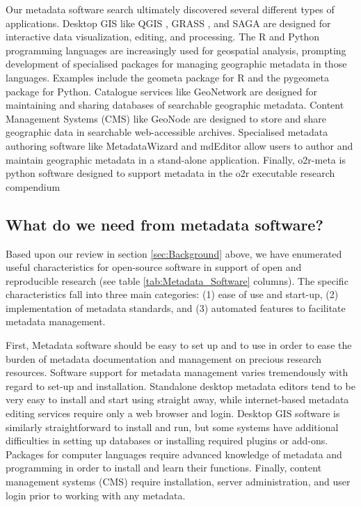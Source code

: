 \documentclass{isprs} %
\begin{document}
Our metadata software search ultimately discovered several different types of applications.
Desktop GIS like QGIS \citep{QGIS2022}, GRASS \citep{grass2020}, and SAGA \citep{gmd-8-1991-2015} are designed for interactive data visualization, editing, and processing.
The R and Python programming languages are increasingly used for geospatial analysis, prompting development of specialised packages for managing geographic metadata in those languages. 
Examples include the geometa package \citep{blondel_2022} for R and the pygeometa package \citep{pygeometa} for Python.
Catalogue services like GeoNetwork \cite{geonetwork} are designed for maintaining and sharing databases of searchable geographic metadata.
Content Management Systems (CMS) like GeoNode \cite{geonode} are designed to store and share geographic data in searchable web-accessible archives.
Specialised metadata authoring software like MetadataWizard \citep{usgs} and mdEditor \citep{ADIwg} allow users to author and maintain geographic metadata in a stand-alone application.
Finally, o2r-meta \citep{nust_daniel_2021_5106499} is python software designed to support metadata in the o2r executable research compendium

\subsection{What do we need from metadata software?}\label{metadataneeds}

Based upon our review in section \ref{sec:Background} above, we have enumerated useful characteristics for open-source software in support of open and reproducible research (see table \ref{tab:Metadata_Software} columns).
The specific characteristics fall into three main categories: (1) ease of use and start-up, (2) implementation of metadata standards, and (3) automated features to facilitate metadata management.

First, Metadata software should be easy to set up and to use in order to ease the burden of metadata documentation and management on precious research resources.
Software support for metadata management varies tremendously with regard to set-up and installation.
Standalone desktop metadata editors tend to be very easy to install and start using straight away, while internet-based metadata editing services require only a web browser and login.
Desktop GIS software is similarly straightforward to install and run, but some systems have additional difficulties in setting up databases or installing required plugins or add-ons.
Packages for computer languages require advanced knowledge of metadata and programming in order to install and learn their functions.
Finally, content management systems (CMS) require installation, server administration, and user login prior to working with any metadata. 
\end{document}
